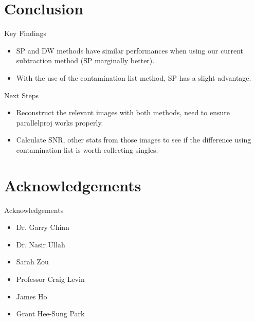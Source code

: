 \documentclass[pdf]{beamer}
\begin{document}
\section{Conclusion}

\begin{frame}{Key Findings}
    \begin{itemize}
        \item SP and DW methods have similar performances when using our current subtraction method (SP marginally better).
        \item With the use of the contamination list method, SP has a slight advantage.
    \end{itemize}
\end{frame}

\begin{frame}{Next Steps}
    \begin{itemize}
        \item Reconstruct the relevant images with both methods, need to ensure parallelproj works properly.
        \item Calculate SNR, other stats from those images to see if the difference using contamination list is worth collecting singles.
    \end{itemize}
\end{frame}


\section{Acknowledgements}

\begin{frame}{Acknowledgements}
\begin{itemize}
\item Dr. Garry Chinn
\item Dr. Nasir Ullah
\item Sarah Zou
\item Professor Craig Levin
\item James Ho
\item Grant Hee-Sung Park
\end{itemize}
\end{frame}
\end{document}
